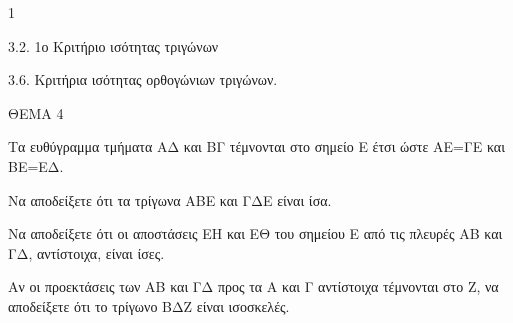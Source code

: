\begin{ylh}{1}
    \item 3.2. 1ο Κριτήριο ισότητας τριγώνων
    \item 3.6. Κριτήρια ισότητας ορθογώνιων τριγώνων.
\end{ylh}

ΘΕΜΑ 4

Τα ευθύγραμμα τμήματα ΑΔ και ΒΓ τέμνονται στο σημείο Ε έτσι ώστε ΑΕ=ΓΕ και ΒΕ=ΕΔ.

\begin{alist}
\item Να αποδείξετε ότι τα τρίγωνα ΑΒΕ και ΓΔΕ είναι ίσα. 

\item Να αποδείξετε ότι οι αποστάσεις ΕΗ και ΕΘ του σημείου Ε από τις πλευρές ΑΒ και ΓΔ, αντίστοιχα, είναι ίσες. 

\item Αν οι προεκτάσεις των ΑΒ και ΓΔ προς τα Α και Γ αντίστοιχα τέμνονται στο Ζ, να αποδείξετε ότι το τρίγωνο ΒΔΖ είναι ισοσκελές. 


\begin{center}
\end{center}
\end{alist}
